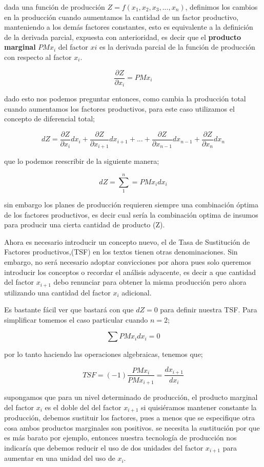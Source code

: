 \documentclass[12pt]{article}
\begin{document}
dada una función de producción 
$Z=f(x_1,x_2,x_3,...,x_n)$, definimos los cambios en la producción cuando aumentamos la cantidad de un factor productivo, manteniendo a los demás factores constantes, esto es equivalente a la definición de la derivada parcial, expuesta con anterioridad, es decir que el \textbf{producto marginal} $PMx_{i}$ del factor $xi$ es la derivada parcial de la función de producción con respecto al factor $x_{i}$.

$$\frac{\partial Z}{\partial x_{i}}= PMx_{i}$$

dado esto nos podemos preguntar entonces, como cambia la producción total cuando aumentamos los factores productivos, para este caso utilizamos el concepto de diferencial total; 

$$dZ= \dfrac{\partial Z}{ \partial x_{i}} dx_{i} + \dfrac{\partial Z}{ \partial x_{i+1}} dx_{i+1} +...+\dfrac{\partial Z}{ \partial x_{n-1}} dx_{n-1} +\dfrac{\partial Z}{ \partial x_{n}} dx_{n}$$

que lo podemos reescribir de la siguiente manera;

$$dZ=\sum_{1}^{n}=PMx_{i}dx_{i}$$

sin embargo los planes de producción requieren siempre una combinación óptima de los factores productivos, es decir cual sería la combinación optima de insumos para producir una cierta cantidad de producto (Z).   

Ahora es necesario introducir un concepto nuevo,  el de Tasa de Sustitución de Factores productivos,(TSF) en los textos tienen otras denominaciones. Sin embargo, no será necesario adoptar convicciones por ahora pues solo queremos introducir los conceptos o recordar el análisis adyacente, es decir a que cantidad del factor $x_{i+1}$ debo renunciar para obtener la misma producción pero ahora utilizando una cantidad del factor $x_{i}$ adicional.


Es bastante fácil ver que  bastará  con que $dZ=0$ para definir nuestra TSF. Para simplificar tomemos el caso particular cuando $n=2$;


$$\sum PMx_{i}dx_{i}=0$$

por lo tanto haciendo las operaciones algebraicas, tenemos que; 

$$  TSF= (-1) \dfrac{PMx_{i}}{PMx_{i+1}}=\dfrac{dx_{i+1}}{dx_{i}}$$

supongamos que para un nivel determinado de producción, el producto marginal del factor $x_{i}$ es el doble del del factor $x_{i+1}$ si quisiéramos mantener constante la producción, debemos  sustituir los factores, pues a menos que se especifique otra cosa ambos productos marginales son positivos. se necesita la sustitución por que es más barato por ejemplo, entonces nuestra tecnología de producción nos indicaría que debemos reducir el uso de dos unidades del factor $x_{i+1}$ para aumentar en una unidad del uso de $x_{i}$.
\end{document}
